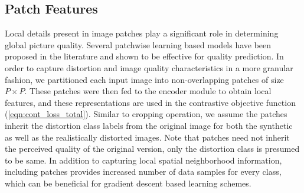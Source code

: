 \documentclass[journal]{IEEEtran}
\begin{document}
\subsection{Patch Features}
Local details present in image patches play a significant role in determining global picture quality. Several patchwise learning based models have been proposed in the literature \cite{kang2014convolutional,kim2017deep} and shown to be effective for quality prediction. In order to capture distortion and image quality characteristics in a more granular fashion, we partitioned each input image into non-overlapping patches of size $P \times P$. These patches were then fed to the encoder module to obtain local features, and these representations are used in the contrastive objective function (\ref{eqn:cont_loss_total}). Similar to cropping operation, we assume the patches inherit the distortion class labels from the original image for both the synthetic as well as the realistically distorted images. Note that patches need not inherit the perceived quality of the original version, only the distortion class is presumed to be same. In addition to capturing local spatial neighborhood information, including patches provides increased number of data samples for every class, which can be beneficial for gradient descent based learning schemes. 
\end{document}
